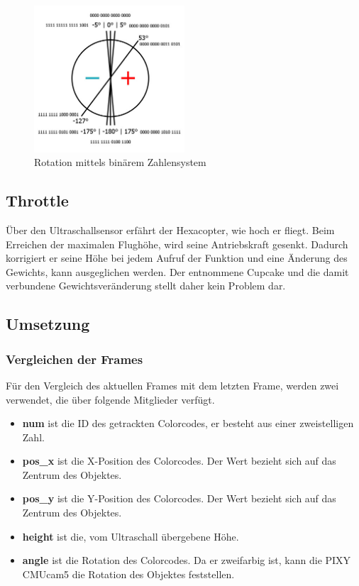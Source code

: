     \begin{figure}[tbh]
      \begin{centering}
        \includegraphics[width = 0.5\textwidth]{Bilder/bor_rot_beschr2}
      \par\end{centering}
      \caption{Rotation mittels binärem Zahlensystem}
      \label{Rotation_Beschreibung}
    \end{figure}

    \subsection*{Throttle}
    Über den Ultraschallsensor erfährt der Hexacopter, wie hoch er fliegt. Beim Erreichen der maximalen Flughöhe, wird seine Antriebskraft gesenkt. Dadurch korrigiert er seine Höhe bei jedem Aufruf der Funktion und eine Änderung des Gewichts, kann ausgeglichen werden. Der entnommene Cupcake und die damit verbundene Gewichtsveränderung stellt daher kein Problem dar.

  \subsection{Umsetzung}

    \subsubsection{Vergleichen der Frames}
    Für den Vergleich des aktuellen Frames mit dem letzten Frame, werden zwei  verwendet, die über folgende Mitglieder verfügt. \cite{Structs}
    \begin{itemize}
      \item \textbf{num} ist die ID des getrackten Colorcodes, er besteht aus einer zweistelligen Zahl.
      \item \textbf{pos\_x} ist die X-Position des Colorcodes. Der Wert bezieht sich auf das Zentrum des Objektes.
      \item \textbf{pos\_y} ist die Y-Position des Colorcodes. Der Wert bezieht sich auf das Zentrum des Objektes.
      \item \textbf{height} ist die, vom Ultraschall übergebene Höhe.
      \item \textbf{angle} ist die Rotation des Colorcodes. Da er zweifarbig ist, kann die PIXY CMUcam5 die Rotation des Objektes feststellen.
    \end{itemize}


